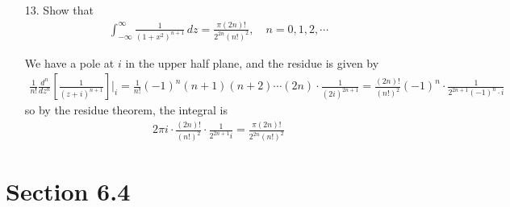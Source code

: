 \documentclass{article}
\begin{document}
\begin{itemize}
	\item[13.] Show that
		\begin{align*}
			\int_{-\infty}^\infty \frac{1}{(1+x^2)^{n+1}}\, dz=\frac{\pi(2n)!}{2^{2n}(n!)^2}, \quad n=0, 1, 2, \cdots
		\end{align*}
		\begin{soln}
			We have a pole at $i$ in the upper half plane, and the residue is given by
			\begin{align*}
				\frac{1}{n!} \frac{d^n}{dz^n} \left[ \frac{1}{(z+i)^{n+1}} \right]\bigg\vert_i = \frac{1}{n!} (-1)^n (n+1)(n+2)\cdots(2n)\cdot \frac{1}{(2i)^{2n+1}} = \frac{(2n)!}{(n!)^2}(-1)^n \cdot \frac{1}{2^{2n+1} (-1)^n \cdot i}
			\end{align*}
			so by the residue theorem, the integral is
			\begin{align*}
				2\pi i\cdot \frac{(2n)!}{(n!)^2}\cdot \frac{1}{2^{2n+1} i} = \frac{\pi(2n)!}{2^{2n}(n!)^2}
			\end{align*}
		\end{soln}
		
\end{itemize}

\section*{Section 6.4}
\end{document}
